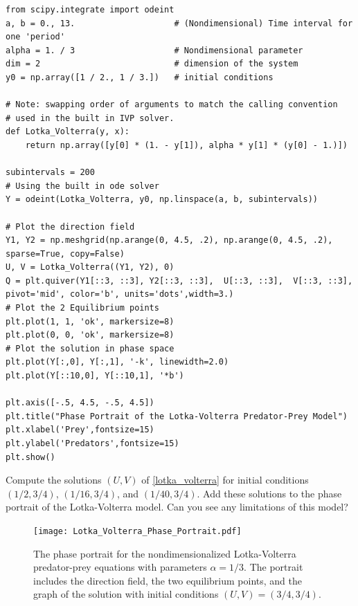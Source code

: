\begin{lstlisting}
from scipy.integrate import odeint
a, b = 0., 13.                    # (Nondimensional) Time interval for one 'period'
alpha = 1. / 3                    # Nondimensional parameter
dim = 2                           # dimension of the system
y0 = np.array([1 / 2., 1 / 3.])   # initial conditions

# Note: swapping order of arguments to match the calling convention
# used in the built in IVP solver.
def Lotka_Volterra(y, x):
    return np.array([y[0] * (1. - y[1]), alpha * y[1] * (y[0] - 1.)])

subintervals = 200
# Using the built in ode solver
Y = odeint(Lotka_Volterra, y0, np.linspace(a, b, subintervals))

# Plot the direction field
Y1, Y2 = np.meshgrid(np.arange(0, 4.5, .2), np.arange(0, 4.5, .2), sparse=True, copy=False)
U, V = Lotka_Volterra((Y1, Y2), 0)
Q = plt.quiver(Y1[::3, ::3], Y2[::3, ::3],  U[::3, ::3],  V[::3, ::3], pivot='mid', color='b', units='dots',width=3.)
# Plot the 2 Equilibrium points
plt.plot(1, 1, 'ok', markersize=8)
plt.plot(0, 0, 'ok', markersize=8)
# Plot the solution in phase space
plt.plot(Y[:,0], Y[:,1], '-k', linewidth=2.0)
plt.plot(Y[::10,0], Y[::10,1], '*b')

plt.axis([-.5, 4.5, -.5, 4.5])
plt.title("Phase Portrait of the Lotka-Volterra Predator-Prey Model")
plt.xlabel('Prey',fontsize=15)
plt.ylabel('Predators',fontsize=15)
plt.show()
\end{lstlisting}

\begin{problem}
Compute the solutions $(U,V)$ of \eqref{lotka_volterra} 
for initial conditions $(1/2, 3/4)$, $(1/16, 3/4)$, and $(1/40, 3/4)$.
Add these solutions to the phase portrait of the Lotka-Volterra model.
Can you see any limitations of this model?
\end{problem}

\begin{figure}
\centering
\texttt{[image: Lotka\_Volterra\_Phase\_Portrait.pdf]}
\caption{The phase portrait for the nondimensionalized Lotka-Volterra predator-prey equations with parameters $\alpha = 1/3$.
The portrait includes the direction field, the two equilibrium points, and the graph of the solution with initial conditions $(U,V) = (3/4, 3/4)$. }
\label{fig:pred-prey_Lotka_Voterra_Phase_Portrait}
\end{figure}

